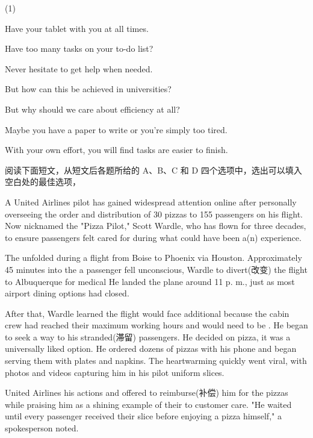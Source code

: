 \documentclass{英语试卷}
\begin{document}
\begin{choices}(1)
  \item Have your tablet with you at all times.
  \item Have too many tasks on your to-do list?
  \item Never hesitate to get help when needed.
  \item But how can this be achieved in universities?
  \item But why should we care about efficiency at all?
  \item Maybe you have a paper to write or you're simply too tired.
  \item With your own effort, you will find tasks are easier to finish.
\end{choices}
\par 阅读下面短文，从短文后各题所给的 A、B、C 和 D 四个选项中，选出可以填入空白处的最佳选项，\par
\par A United Airlines pilot has gained widespread attention online after personally overseeing the order and distribution of 30 pizzas to 155 passengers on his flight. Now nicknamed the "Pizza Pilot," Scott Wardle, who has flown for three decades,  to ensure passengers felt cared for during what could have been a(n)  experience.\par
\par The  unfolded during a flight from Boise to Phoenix via Houston. Approximately 45 minutes into the  a passenger fell unconscious,  Wardle to divert(改变) the flight to Albuquerque for medical  He landed the plane around 11 p. m., just as most airport dining options had closed.\par
\par After that, Wardle learned the flight would face additional  because the cabin crew had reached their maximum working hours and would need to be . He began to seek a way to  his stranded(滞留) passengers. He decided on pizza,  it was a universally liked option. He  ordered dozens of pizzas with his phone and began serving them with plates and napkins. The heartwarming  quickly went viral, with photos and videos capturing him in his pilot uniform  slices.\par
\par United Airlines  his actions and offered to reimburse(补偿) him for the pizzas while praising him as a shining example of their  to customer care. "He waited until every passenger received their slice before enjoying a pizza himself," a spokesperson noted.\par
\end{document}
